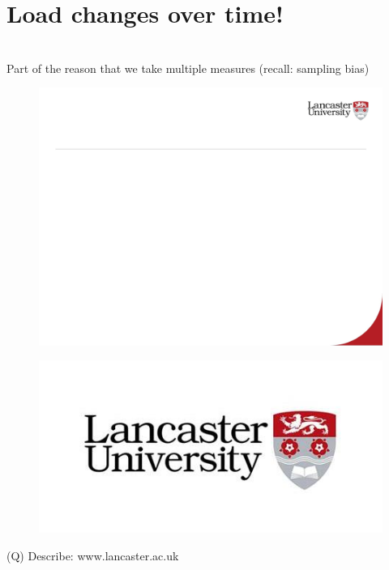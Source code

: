 \documentclass[12pt]{article}
\begin{document}
\section{Load changes over time!}
\\
Part of the reason that we take multiple measures (recall: sampling bias)\\
\begin{figure}[H]
\includegraphics[width=0.5\linewidth]{page64-image-1.png}
\end{figure}
\begin{figure}[H]
\includegraphics[width=0.5\linewidth]{page64-image-2.png}
\end{figure}
\clearpage
(Q)
Describe: www.lancaster.ac.uk
\clearpage
\end{document}
